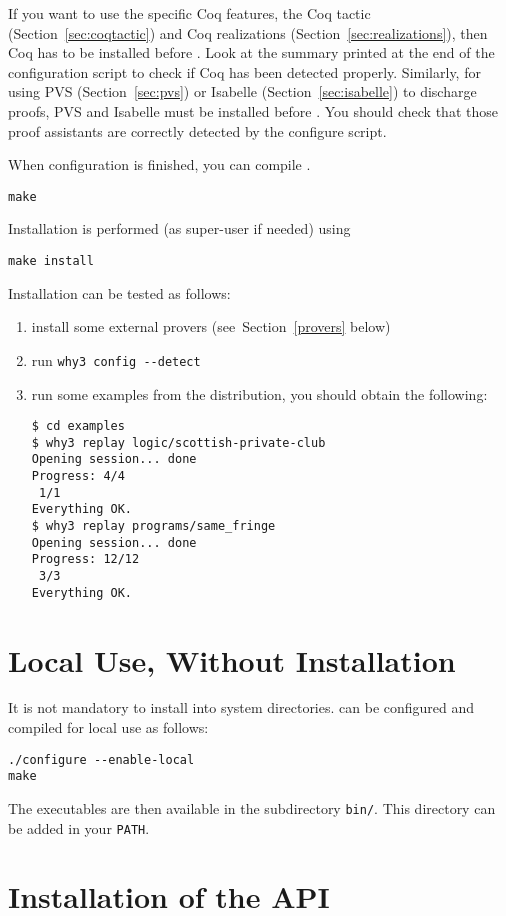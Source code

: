 If you want to use the specific Coq features, \ie the Coq tactic
(Section~\ref{sec:coqtactic}) and Coq realizations
(Section~\ref{sec:realizations}), then Coq has to be installed before
\why. Look at the summary printed at the end of the configuration
script to check if Coq has been detected properly. Similarly, for
using PVS (Section~\ref{sec:pvs}) or Isabelle (Section~\ref{sec:isabelle}) to discharge proofs, PVS and Isabelle must be
installed before \why. You should check that those proof assistants
are correctly detected by the configure script.

When configuration is finished, you can compile \why.
\begin{verbatim}
make
\end{verbatim}
Installation is performed (as super-user if needed) using
\begin{verbatim}
make install
\end{verbatim}
Installation can be tested as follows:
\begin{enumerate}
\item install some external provers (see~Section~\ref{provers} below)
\item run \verb|why3 config --detect|
\item run some examples from the distribution, \eg you should
obtain the following:
\begin{verbatim}
$ cd examples
$ why3 replay logic/scottish-private-club
Opening session... done
Progress: 4/4
 1/1
Everything OK.
$ why3 replay programs/same_fringe
Opening session... done
Progress: 12/12
 3/3
Everything OK.
\end{verbatim}
\end{enumerate}

\section{Local Use, Without Installation}

It is not mandatory to install \why into system directories.
\why can be configured and compiled for local use as follows:
\begin{verbatim}
./configure --enable-local
make
\end{verbatim}
The \why executables are then available in the subdirectory
\texttt{bin/}. This directory can be added in your \texttt{PATH}.

\section{Installation of the \why API}
\label{sec:installlib}

